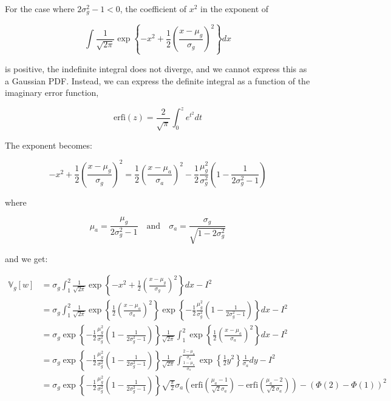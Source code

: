 For the case where \(2 \sigma_g^{2} - 1 < 0\), the coefficient of \(x^{2}\)
in the exponent of

\[ \int \frac{1}{\sqrt{2 \pi}} \exp \left\{ -x^{2} +\frac{1}{2} \left(\frac{x - \mu_g}{\sigma_g}\right)^{2} \right\} dx \]

is positive, the indefinite integral does not diverge, and we cannot
express this as a Gaussian PDF. Instead, we can express the definite
integral as a function of the imaginary error function,

\[ \text{erfi}(z) = \frac{2}{\sqrt{\pi}} \int_{0}^z e^{t^{2}} dt \]

The exponent becomes:

\[ 
-x^{2} +\frac{1}{2} \left(\frac{x - \mu_g}{\sigma_g}\right)^{2} = \frac{1}{2} \left( \frac{x - \mu_a}{\sigma_a} \right)^{2} - \frac{1}{2} \frac{\mu_g^{2}}{\sigma_g^{2}} \left(1 - \frac{1}{2\sigma_g^{2} - 1} \right)
\]

where

\[ \mu_a = \frac{\mu_g}{2\sigma_g^{2} - 1} 
\quad \text{and} \quad
\sigma_a = \frac{\sigma_g}{\sqrt{1 - 2 \sigma_g^{2}}} \]

and we get:

\begin{align*}
\mathbb{V}_g[w] &= \sigma_g \int_{1}^{2} \frac{1}{\sqrt{2 \pi}} \exp \left\{ -x^{2} +\frac{1}{2} \left(\frac{x - \mu_g}{\sigma_g}\right)^{2} \right\} dx - I^{2} \\
&= \sigma_g \int_{1}^{2} \frac{1}{\sqrt{2 \pi}} \exp \left\{ \frac{1}{2} \left( \frac{x - \mu_a}{\sigma_a} \right)^{2} \right\} \exp \left\{ - \frac{1}{2} \frac{\mu_g^{2}}{\sigma_g^{2}} \left(1 - \frac{1}{2\sigma_g^{2} - 1} \right) \right\} dx - I^{2} \\
&= \sigma_g \exp \left\{ - \frac{1}{2} \frac{\mu_g^{2}}{\sigma_g^{2}} \left(1 - \frac{1}{2\sigma_g^{2} - 1} \right) \right\} \frac{1}{\sqrt{2 \pi}} \int_{1}^{2} \exp \left\{ \frac{1}{2} \left( \frac{x - \mu_a}{\sigma_a} \right)^{2} \right\} dx - I^{2} \\
&= \sigma_g \exp \left\{ - \frac{1}{2} \frac{\mu_g^{2}}{\sigma_g^{2}} \left(1 - \frac{1}{2\sigma_g^{2} - 1} \right) \right\} \frac{1}{\sqrt{2 \pi}} \int_{\frac{1 - \mu_a}{\sigma_a}}^{\frac{2 - \mu_a}{\sigma_a}} \exp \left\{ \frac{1}{2} y^{2} \right\} \frac{1}{\sigma_a} dy - I^{2} \\
&= \sigma_g \exp \left\{ - \frac{1}{2} \frac{\mu_g^{2}}{\sigma_g^{2}} \left(1 - \frac{1}{2\sigma_g^{2} - 1} \right) \right\} \sqrt{\frac{\pi}{2}} \sigma_a \left( \text{erfi}\left( \frac{\mu_a - 1}{\sqrt{2} \sigma_a} \right) - \text{erfi}\left( \frac{\mu_a - 2}{\sqrt{2} \sigma_a} \right) \right) - \left( \Phi(2) - \Phi(1) \right)^{2}
\end{align*}

